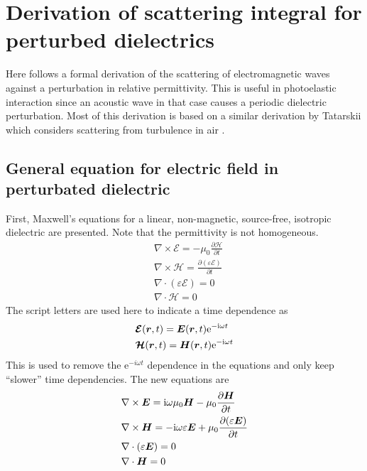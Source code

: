 \documentclass[11pt,twoside]{eitExjobb}
\begin{document}
	\section{Derivation of scattering integral for perturbed dielectrics \label{sec:app-derivations-scatter}}
	Here follows a formal derivation of the scattering of electromagnetic waves against a perturbation in relative permittivity. This is useful in photoelastic interaction since an acoustic wave in that case causes a periodic dielectric perturbation. Most of this derivation is based on a similar derivation by Tatarskii which considers scattering from turbulence in air \cite{Tatarskii1971}.
	
	\subsection{General equation for electric field in perturbated dielectric \label{sec:app-derivations-scatter-general}}
	First, Maxwell's equations for a linear, non-magnetic, source-free, isotropic dielectric are presented. Note that the permittivity is not homogeneous.
	\begin{align*}
		&\nabla \times \bm{\mathcal{E}} = -\mu_0 \frac{\partial \bm{\mathcal{H}}}{\partial t} \\
		&\nabla \times \bm{\mathcal{H}} = \frac{\partial (\varepsilon \bm{\mathcal{E}})}{\partial t} \\
		&\nabla \cdot (\varepsilon \bm{\mathcal{E}}) = 0 \\
		&\nabla \cdot \bm{\mathcal{H}} = 0
	\end{align*}
	The script letters are used here to indicate a time dependence as
	\begin{align*}
		&\bm{\mathcal{E}}(\bm{r},t) = \bm{E}(\bm{r},t) \mathrm{e}^{-\mathrm{i}\omega t} \\
		&\bm{\mathcal{H}}(\bm{r},t) = \bm{H}(\bm{r},t) \mathrm{e}^{-\mathrm{i}\omega t}
	\end{align*}
	This is used to remove the e$^{-i\omega t}$ dependence in the equations and only keep ``slower'' time dependencies. The new equations are
	\begin{align}
		&\nabla \times \bm{E} = \mathrm{i}\omega \mu_0 \bm{H} - \mu_0 \frac{\partial \bm{H}}{\partial t} \label{eq:app-scatter-faraday} \\
		&\nabla \times \bm{H} = -\mathrm{i}\omega \varepsilon \bm{E} + \mu_0 \frac{\partial (\varepsilon \bm{E})}{\partial t} \label{eq:app-scatter-ampere} \\
		&\nabla \cdot (\varepsilon \bm{E}) = 0 \label{eq:app-scatter-gauss} \\
		&\nabla \cdot \bm{H} = 0 \label{eq:app-scatter-magn}
	\end{align}
\end{document}
